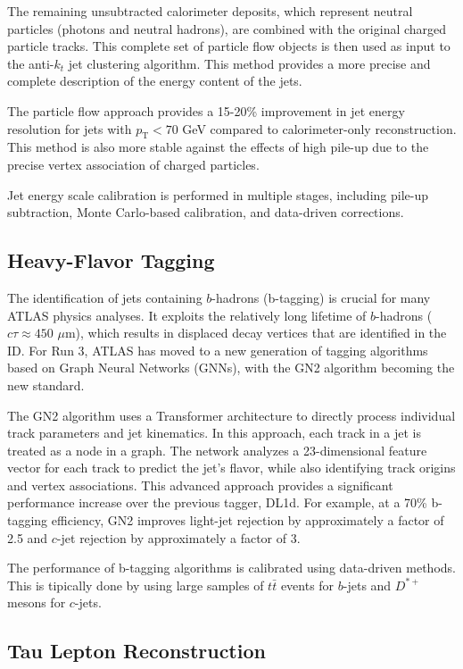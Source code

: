 The remaining unsubtracted calorimeter deposits, which represent neutral particles (photons and neutral hadrons), are combined with the original charged particle tracks. This complete set of particle flow objects is then used as input to the anti-$k_t$ jet clustering algorithm. This method provides a more precise and complete description of the energy content of the jets.

The particle flow approach provides a 15-20\% improvement in jet energy resolution for jets with $p_\text{T}<70$ GeV compared to calorimeter-only reconstruction. This method is also more stable against the effects of high pile-up due to the precise vertex association of charged particles.

Jet energy scale calibration is performed in multiple stages, including pile-up subtraction, Monte Carlo-based calibration, and data-driven corrections.

\subsection{Heavy-Flavor Tagging}

The identification of jets containing $b$-hadrons (b-tagging) is crucial for many ATLAS physics analyses. It exploits the relatively long lifetime of $b$-hadrons ($c\tau \approx 450$ $\mu$m), which results in displaced decay vertices that are identified in the ID. For Run 3, ATLAS has moved to a new generation of tagging algorithms based on Graph Neural Networks (GNNs), with the GN2 algorithm becoming the new standard.

The GN2 algorithm uses a Transformer architecture to directly process individual track parameters and jet kinematics. In this approach, each track in a jet is treated as a node in a graph. The network analyzes a 23-dimensional feature vector for each track to predict the jet's flavor, while also identifying track origins and vertex associations. This advanced approach provides a significant performance increase over the previous tagger, DL1d. For example, at a 70\% b-tagging efficiency, GN2 improves light-jet rejection by approximately a factor of 2.5 and $c$-jet rejection by approximately a factor of 3.

The performance of b-tagging algorithms is calibrated using data-driven methods. This is tipically done by using large samples of $t\bar{t}$ events for $b$-jets and $D^{*+}$ mesons for $c$-jets.

\subsection{Tau Lepton Reconstruction}

